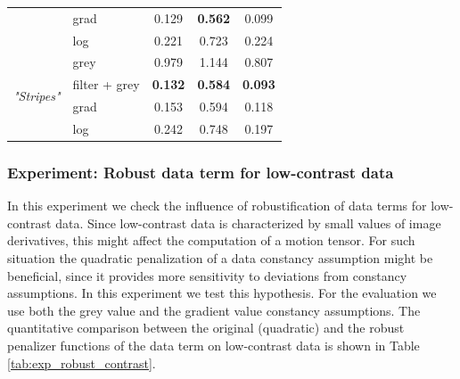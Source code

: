 \begin{table}[ht]
\begin{tabular}{rrcrr}
          & \multicolumn{1}{l}{grad} & 0.129 & \multicolumn{1}{c}{\textbf{0.562}} & \multicolumn{1}{c}{0.099} \\
          & \multicolumn{1}{l}{log} & 0.221 & \multicolumn{1}{c}{0.723} & \multicolumn{1}{c}{0.224} \\
          \midrule
    \multicolumn{1}{l}{\multirow{4}[1]{*}{\textit{"Stripes"}}} & \multicolumn{1}{l}{grey} & 0.979 & \multicolumn{1}{c}{1.144} & \multicolumn{1}{c}{0.807} \\
          & \multicolumn{1}{l}{filter + grey} & \textbf{0.132} & \multicolumn{1}{c}{\textbf{0.584}} & \multicolumn{1}{c}{\textbf{0.093}} \\
          & \multicolumn{1}{l}{grad} & 0.153 & \multicolumn{1}{c}{0.594} & \multicolumn{1}{c}{0.118} \\
          & \multicolumn{1}{l}{log} & 0.242 & \multicolumn{1}{c}{0.748} & \multicolumn{1}{c}{0.197} \\
    \bottomrule
    \end{tabular}%
  \label{tab:exp_bright_data_terms}%
\end{table}%




\subsubsection{Experiment: Robust data term for low-contrast data}
\label{experiment_robust_data_term_low_contrast}

In this experiment we check the influence of robustification of data terms for low-contrast data. Since low-contrast data is characterized by small values of image derivatives, this might affect the computation of a motion tensor. For such situation the quadratic penalization of a data constancy assumption might be beneficial, since it provides more sensitivity to deviations from constancy assumptions.  In this experiment we test this hypothesis. For the evaluation we use both the grey value and the gradient value constancy assumptions.
The quantitative comparison between the original (quadratic) and the robust penalizer functions of the data term on low-contrast data is shown in Table \ref{tab:exp_robust_contrast}.
 


